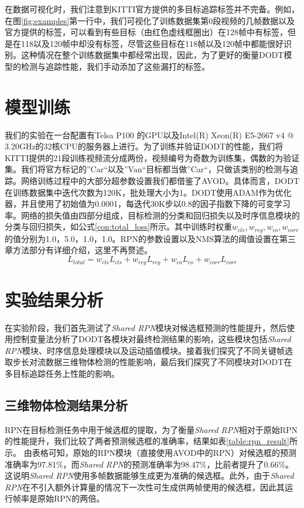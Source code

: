 在数据可视化时，我们注意到KITTI官方提供的多目标追踪标签并不完备。例如，在图\ref{fig:examples}第一行中，我们可视化了训练数据集第0段视频的几帧数据以及官方提供的标签，可以看到有些目标（由红色虚线框圈出）在128帧中有标签，但是在118以及120帧中却没有标签，尽管这些目标在118帧以及120帧中都能很好识别。这种情况在整个训练数据集中都经常出现，因此，为了更好的衡量DODT模型的检测与追踪性能，我们手动添加了这些漏打的标签。

\section{模型训练}
\label{training}
我们的实验在一台配置有Telsa P100 的GPU以及Intel(R) Xeon(R) E5-2667 v4 @ 3.20GHz的32核CPU的服务器上进行。为了训练并验证DODT的性能，我们将KITTI提供的21段训练视频流分成两份，视频编号为奇数为训练集，偶数的为验证集。我们将官方标记的”Car“以及”Van“目标都当做”Car“，只做该类别的检测与追踪。网络训练过程中的大部分超参数设置我们都借鉴了AVOD\cite{ku2018joint}。具体而言，DODT在训练数据集中迭代次数为120K，批处理大小为1。DODT使用ADAM\cite{kingma2014adam}作为优化器，并且使用了初始值为0.0001，每迭代30K步以0.8的因子指数下降的可变学习率。网络的损失值由四部分组成，目标检测的分类和回归损失以及时序信息模块的分类与回归损失，如公式\ref{con:total_loss}所示。其中训练时权重$w_{cls}, w_{reg}, w_{co}, w_{corr}$的值分别为1.0，5.0，1.0，1.0。RPN的参数设置以及NMS算法的阈值设置在第三章方法部分有详细介绍，这里不再赘述。
\begin{equation}
L_{total} = w_{cls}L_{cls} + w_{reg}L_{reg} + w_{co}L_{co} + w_{corr}L_{corr}
\label{con:total_loss}
\end{equation}

\section{实验结果分析}
\label{results}

在实验阶段，我们首先测试了\textit{Shared RPN}模块对候选框预测的性能提升，然后使用控制变量法分析了DODT各模块对最终检测结果的影响，这些模块包括\textit{Shared RPN}模块、时序信息处理模块以及运动插值模块。接着我们探究了不同关键帧选取步长对流数据三维物体检测的性能影响，最后我们探究了不同模块对DODT在多目标追踪任务上性能的影响。

\subsection{三维物体检测结果分析}
\label{ablation_study}

RPN在目标检测任务中用于候选框的提取，为了衡量\textit{Shared RPN}相对于原始RPN的性能提升，我们比较了两者预测候选框的准确率，结果如表\ref{table:rpn_result}所示。
由表格可知，原始的RPN模块（直接使用AVOD\cite{ku2018joint}中的RPN）对候选框的预测准确率为97.81\%，而\textit{Shared RPN}的预测准确率为98.47\%，比前者提升了0.66\%。这说明\textit{Shared RPN}使用多帧数据能够生成更为准确的候选框。此外，由于\textit{Shared RPN}在不引入额外计算量的情况下一次性可生成供两帧使用的候选框，因此其运行帧率是原始RPN的两倍。

